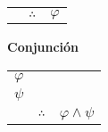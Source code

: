 \documentclass[12pt]{report}
\theoremstyle{largebreak}
\begin{document}
\begin{propo}
\begin{center}
\begin{tabular}{c c c}
                \hline
                 & $\therefore$ & $\varphi$ \\
            \end{tabular}
        \end{center}
        \begin{center}
            \textbf{Conjunción}
        \end{center}
        \begin{center}
            \begin{tabular}{c c c}
                $\varphi$ &  &  \\
                $\psi$ &  &  \\
                \hline
                 & $\therefore$ & $\varphi\land\psi$ \\
            \end{tabular}
        \end{center}
    \end{propo}
\end{document}

